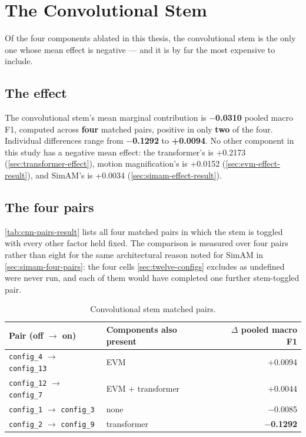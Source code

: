 \section{The Convolutional Stem}
\label{sec:cnn-results}

Of the four components ablated in this thesis, the convolutional stem is the only one whose mean effect is negative --- and it is by far the most expensive to include.

\subsection{The effect}
\label{sec:cnn-effect-result}

The convolutional stem's mean marginal contribution is \textbf{$-$0.0310} pooled macro F1, computed across \textbf{four} matched pairs, positive in only \textbf{two} of the four. Individual differences range from \textbf{$-$0.1292} to \textbf{+0.0094}. No other component in this study has a negative mean effect: the transformer's is +0.2173 (\autoref{sec:transformer-effect}), motion magnification's is +0.0152 (\autoref{sec:evm-effect-result}), and SimAM's is +0.0034 (\autoref{sec:simam-effect-result}).

\subsection{The four pairs}
\label{sec:cnn-four-pairs}

\autoref{tab:cnn-pairs-result} lists all four matched pairs in which the stem is toggled with every other factor held fixed. The comparison is measured over four pairs rather than eight for the same architectural reason noted for SimAM in \autoref{sec:simam-four-pairs}: the four cells \autoref{sec:twelve-configs} excludes as undefined were never run, and each of them would have completed one further stem-toggled pair.

\begin{table}[htbp]
	\centering
	\begin{tabular}{l l r}
		\hline
		\textbf{Pair (off $\rightarrow$ on)} & \textbf{Components also present} & \textbf{$\Delta$ pooled macro F1} \\
		\hline
		\texttt{config\_4} $\rightarrow$ \texttt{config\_13} & EVM               & +0.0094 \\
		\texttt{config\_12} $\rightarrow$ \texttt{config\_7} & EVM + transformer & +0.0044 \\
		\texttt{config\_1} $\rightarrow$ \texttt{config\_3}  & none              & $-$0.0085 \\
		\texttt{config\_2} $\rightarrow$ \texttt{config\_9}  & transformer       & \textbf{$-$0.1292} \\
		\hline
	\end{tabular}
	\caption[Convolutional stem matched pairs]{Convolutional stem matched pairs.}
	\label{tab:cnn-pairs-result}
\end{table}

